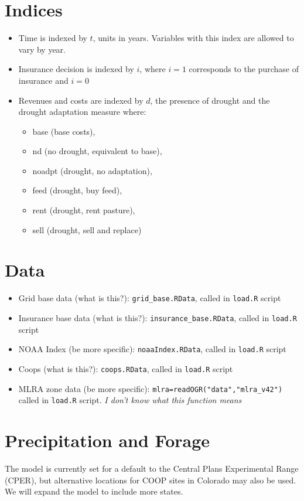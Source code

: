 \documentclass[11pt]{article}
\begin{document}
\section{Indices}
\begin{itemize}
\item Time is indexed by $t$, units in years. Variables with this index are allowed to vary by year.
\item Insurance decision is indexed by $i$, where $i=1$ corresponds to the purchase of insurance and $i=0$
\item Revenues and costs are indexed by $d$, the presence of drought and the drought adaptation measure where: 
	\begin{itemize}
	\item base (base costs),
	\item nd (no drought, equivalent to base),
	\item noadpt (drought, no adaptation), 
	\item feed (drought, buy feed), 
	\item rent (drought, rent pasture),
	\item sell (drought, sell and replace)
	\end{itemize}
\end{itemize}


\section{Data}
\begin{itemize}
\item Grid base data (what is this?): \verb!grid_base.RData!, called in \verb!load.R! script
\item Insurance base data (what is this?): \verb!insurance_base.RData!, called in \verb!load.R! script
\item NOAA Index (be more specific): \verb!noaaIndex.RData!, called in \verb!load.R! script
\item Coops (what is this?): \verb!coops.RData!, called in \verb!load.R! script
\item MLRA zone data (be more specific): \verb!mlra=readOGR("data","mlra_v42")!  called in \verb!load.R! script. \textit{I don't know what this function means}
\end{itemize}

\section{Precipitation and Forage}
The model is currently set for a default to the Central Plans Experimental Range (CPER), but alternative locations for COOP sites in Colorado may also be used. We will expand the model to include more states.
\end{document}
